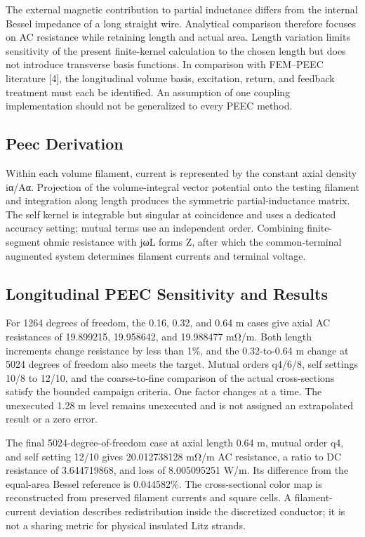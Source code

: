 \documentclass[11pt]{article}
\begin{document}
The external magnetic contribution to partial inductance differs from the internal Bessel impedance of a long straight wire. Analytical comparison therefore focuses on AC resistance while retaining length and actual area. Length variation limits sensitivity of the present finite-kernel calculation to the chosen length but does not introduce transverse basis functions. In comparison with FEM–PEEC literature [4], the longitudinal volume basis, excitation, return, and feedback treatment must each be identified. An assumption of one coupling implementation should not be generalized to every PEEC method.


\subsection*{Peec Derivation}
\hypertarget{06.peec_derivation.heading}{}
Within each volume filament, current is represented by the constant axial density iα/Aα. Projection of the volume-integral vector potential onto the testing filament and integration along length produces the symmetric partial-inductance matrix. The self kernel is integrable but singular at coincidence and uses a dedicated accuracy setting; mutual terms use an independent order. Combining finite-segment ohmic resistance with jωL forms Z, after which the common-terminal augmented system determines filament currents and terminal voltage.


\subsection*{Longitudinal PEEC Sensitivity and Results}
\hypertarget{06.peec_results.heading}{}
For 1264 degrees of freedom, the 0.16, 0.32, and 0.64 m cases give axial AC resistances of 19.899215, 19.958642, and 19.988477 mΩ/m. Both length increments change resistance by less than 1\%, and the 0.32-to-0.64 m change at 5024 degrees of freedom also meets the target. Mutual orders q4/6/8, self settings 10/8 to 12/10, and the coarse-to-fine comparison of the actual cross-sections satisfy the bounded campaign criteria. One factor changes at a time. The unexecuted 1.28 m level remains unexecuted and is not assigned an extrapolated result or a zero error.


The final 5024-degree-of-freedom case at axial length 0.64 m, mutual order q4, and self setting 12/10 gives 20.012738128 mΩ/m AC resistance, a ratio to DC resistance of 3.644719868, and loss of 8.005095251 W/m. Its difference from the equal-area Bessel reference is 0.044582\%. The cross-sectional color map is reconstructed from preserved filament currents and square cells. A filament-current deviation describes redistribution inside the discretized conductor; it is not a sharing metric for physical insulated Litz strands.
\end{document}
